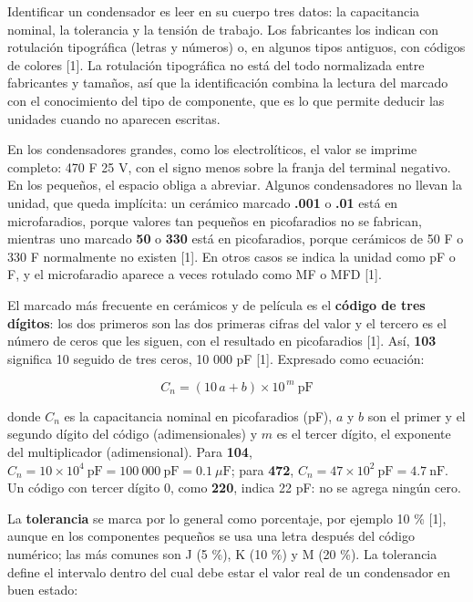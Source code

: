 \documentclass[11pt,letterpaper]{article}
\begin{document}
Identificar un condensador es leer en su cuerpo tres datos: la capacitancia nominal, la tolerancia y la tensión de trabajo. Los fabricantes los indican con rotulación tipográfica (letras y números) o, en algunos tipos antiguos, con códigos de colores [1]. La rotulación tipográfica no está del todo normalizada entre fabricantes y tamaños, así que la identificación combina la lectura del marcado con el conocimiento del tipo de componente, que es lo que permite deducir las unidades cuando no aparecen escritas.

En los condensadores grandes, como los electrolíticos, el valor se imprime completo: \guillemotleft{}470 \textmu{}F 25 V\guillemotright{}, con el signo menos sobre la franja del terminal negativo. En los pequeños, el espacio obliga a abreviar. Algunos condensadores no llevan la unidad, que queda implícita: un cerámico marcado \textbf{.001} o \textbf{.01} está en microfaradios, porque valores tan pequeños en picofaradios no se fabrican, mientras uno marcado \textbf{50} o \textbf{330} está en picofaradios, porque cerámicos de 50 \textmu{}F o 330 \textmu{}F normalmente no existen [1]. En otros casos se indica la unidad como pF o \textmu{}F, y el microfaradio aparece a veces rotulado como MF o MFD [1].

El marcado más frecuente en cerámicos y de película es el \textbf{código de tres dígitos}: los dos primeros son las dos primeras cifras del valor y el tercero es el número de ceros que les siguen, con el resultado en picofaradios [1]. Así, \textbf{103} significa 10 seguido de tres ceros, 10 000 pF [1]. Expresado como ecuación:

\begin{equation}
  C_{n} = (10\,a + b) \times 10^{\,m}\ \text{pF}
\end{equation}

donde $C_n$ es la capacitancia nominal en picofaradios (pF), $a$ y $b$ son el primer y el segundo dígito del código (adimensionales) y $m$ es el tercer dígito, el exponente del multiplicador (adimensional). Para \textbf{104}, $C_n = 10 \times 10^4\ \text{pF} = 100\ 000\ \text{pF} = 0.1\ \mu\text{F}$; para \textbf{472}, $C_n = 47 \times 10^2\ \text{pF} = 4.7\ \text{nF}$. Un código con tercer dígito 0, como \textbf{220}, indica 22 pF: no se agrega ningún cero.

La \textbf{tolerancia} se marca por lo general como porcentaje, por ejemplo \textpm{}10 \% [1], aunque en los componentes pequeños se usa una letra después del código numérico; las más comunes son J (\textpm{}5 \%), K (\textpm{}10 \%) y M (\textpm{}20 \%). La tolerancia define el intervalo dentro del cual debe estar el valor real de un condensador en buen estado:
\end{document}
